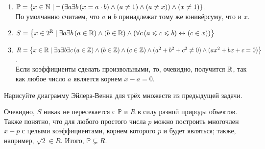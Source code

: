 \begin{Answer}
    \noindent
    \begin{enumerate}[label=\arabic*)]
    \item $ \mathbb{P} = \left \{ x \in \mathbb{N} \mid \neg \left( \exists a \exists b \, (x = a \cdot b) \wedge (a \neq 1) \wedge (a \neq x) \right) \wedge (x \neq 1) \right \} $.\\
        По умолчанию считаем, что $ a $ и $ b $ принадлежат тому же юнивёрсуму, что и $ x $.
    \item $ S = \left\{ x \in 2^{\mathbb{R}} \mid \exists a \exists b \, (a \in \mathbb{R}) \wedge (b \in \mathbb{R}) \wedge \left( \forall c \, (a \leqslant c \leqslant b) \leftrightarrow (c \in x) \right) \right\} $
    \item $ R = \left\{ x \in \mathbb{R} \mid \exists a \exists b \exists c \, (a \in \mathbb{Z}) \wedge (b \in \mathbb{Z}) \wedge (c \in \mathbb{Z}) \wedge (a^2 + b^2 + c^2 \neq 0) \wedge (a x^2 + b x + c = 0) \right\} $.\\
          Если коэффициенты сделать произвольными, то, очевидно, получится $ \mathbb{R} $, так как любое число $ a $ является корнем $ x - a = 0 $.
    \end{enumerate}
\end{Answer}


\begin{Exercise}[counter=SecExercise]
    \noindent
    Нарисуйте диаграмму Эйлера-Венна для трёх множеств из предыдущей задачи.
\end{Exercise}

\begin{Answer}
    \noindent
    Очевидно, $ S $ никак не пересекается с $ \mathbb{P} $ и $ R $ в силу разной природы объектов.
    Также понятно, что для любого простого числа $ p $ можно построить многочлен $ x - p $ с целыми коэффициентами, корнем которого $ p $ и будет являться;
    также, например, $ \sqrt{2} \in R $.
    Итого, $ \mathbb{P} \varsubsetneq R $.

\end{Answer}



